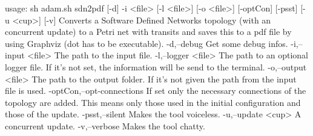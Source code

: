 usage: sh adam.sh sdn2pdf [-d] -i <file> [-l <file>] [-o <file>] [-optCon]
       [-psst] [-u <cup>] [-v]
Converts a Software Defined Networks topology (with an concurrent update)
to a Petri net with transits and saves this to a pdf file by using
Graphviz (dot has to be executable).
 -d,--debug                  Get some debug infos.
 -i,--input <file>           The path to the input file.
 -l,--logger <file>          The path to an optional logger file. If it's
                             not set, the information will be send to the
                             terminal.
 -o,--output <file>          The path to the output folder. If it's not
                             given the path from the input file is used.
 -optCon,--opt-connections   If set only the necessary connections of the
                             topology are added. This means only those
                             used in the initial configuration and those
                             of the update.
 -psst,--silent              Makes the tool voiceless.
 -u,--update <cup>           A concurrent update.
 -v,--verbose                Makes the tool chatty.
